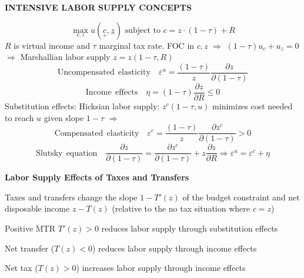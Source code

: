 \documentclass[landscape]{slides}
\begin{document}
\begin{slide}
\begin{center}
{\bf INTENSIVE LABOR SUPPLY CONCEPTS}
\end{center}
 \[ \max_{c,z} u(\underset{+}{c},\underset{-}{z}) \text{ subject to  } c=z \cdot (1-\tau)+R\] 
$R$ is virtual income and
$\tau$ marginal tax rate.   FOC in $c,z$ $\Rightarrow$
$(1-\tau) u_c+u_z=0$ $\Rightarrow$ Marshallian labor supply
$z=z(1-\tau,R)$
\[ \mathrm{Uncompensated\:\:elasticity} \quad \varepsilon^u=\frac{(1-\tau)}{z}\frac{\partial z}
{\partial (1-\tau)} \]
\[ \mathrm{Income\:\:effects} \quad \eta=(1-\tau)\frac{ \partial z}{\partial R} \leq 0 \]
Substitution effects: Hicksian labor supply: $z^c(1-\tau,u)$
minimizes cost needed to reach $u$ given slope $1-\tau$ $\Rightarrow$
\[ \mathrm{Compensated\:\:elasticity} \quad \varepsilon^c=\frac{(1-\tau)}{z}\frac{\partial z^c}
{\partial (1-\tau)} > 0 \]
\[\mathrm{Slutsky\:\:equation} \quad \frac{\partial z}{\partial (1-\tau)} = \frac{\partial z^c}{\partial (1-\tau)}
+ z \frac{ \partial z}{\partial R} \Rightarrow \varepsilon^u = \varepsilon^c + \eta\]
\end{slide}

\begin{slide}

\end{slide}

\begin{slide}
\begin{center}
{\bf Labor Supply Effects of Taxes and Transfers}
\end{center}
Taxes and transfers change the slope $1-T'(z)$ of the budget constraint and net disposable income $z-T(z)$
(relative to the no tax situation where $c=z$)

Positive MTR $T'(z)>0$ reduces labor supply through substitution effects

Net transfer ($T(z)<0$) reduces labor supply through income effects

Net tax ($T(z)>0$) increases labor supply through income effects

\end{slide}

\begin{slide}

\end{slide}
\end{document}
